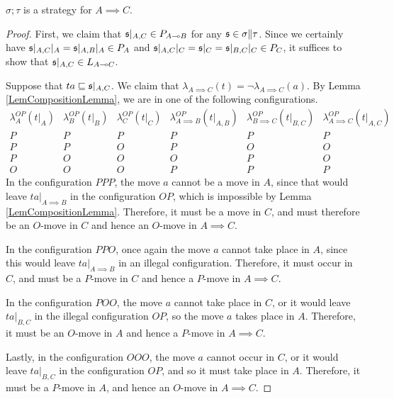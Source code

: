 \documentclass[11pt]{report}
\begin{document}
\begin{proposition}
  $\sigma;\tau$ is a strategy for $A\implies C$.  
\end{proposition}
\begin{proof}
  First, we claim that $\mathfrak s\vert_{A,C}\in P_{A\multimap B}$ for any $\mathfrak s\in \sigma\|\tau$.
  Since we certainly have $\mathfrak s\vert_{A,C}\vert_A = \mathfrak s\vert_{A,B}\vert_A\in P_A$ and $\mathfrak s\vert_{A,C}\vert_C = \mathfrak s\vert_C = \mathfrak s\vert_{B,C}\vert_C\in P_C$, it suffices to show that $\mathfrak s\vert_{A,C}\in L_{A\multimap C}$.

  Suppose that $ta\sqsubseteq \mathfrak s\vert_{A,C}$.  We claim that $\lambda_{A\implies C}(t) = \neg\lambda_{A\implies C}(a)$.
  By Lemma \ref{LemCompositionLemma}, we are in one of the following configurations.
  \small
  \[
    \begin{array}{ccc|ccc}
      \lambda_A^{OP}(t\vert_A) & \lambda_B^{OP}(t\vert_B) & \lambda_C^{OP}(t\vert_C) & \lambda_{A\implies B}^{OP}(t\vert_{A,B}) & \lambda_{B\implies C}^{OP}(t\vert_{B,C}) & \lambda_{A\implies C}^{OP}(t\vert_{A,C}) \\
      \hline
      P & P & P & P & P & P \\
      P & P & O & P & O & O \\
      P & O & O & O & P & O \\
      O & O & O & P & P & P 
    \end{array}
    \]
  \normalsize
  In the configuration $PPP$, the move $a$ cannot be a move in $A$, since that would leave $ta\vert_{A\implies B}$ in the configuration $OP$, which is impossible by Lemma \ref{LemCompositionLemma}.  
  Therefore, it must be a move in $C$, and must therefore be an $O$-move in $C$ and hence an $O$-move in $A\implies C$.

  In the configuration $PPO$, once again the move $a$ cannot take place in $A$, since this would leave $ta\vert_{A\implies B}$ in an illegal configuration.  
  Therefore, it must occur in $C$, and must be a $P$-move in $C$ and hence a $P$-move in $A\implies C$.

  In the configuration $POO$, the move $a$ cannot take place in $C$, or it would leave $ta\vert_{B,C}$ in the illegal configuration $OP$, so the move $a$ takes place in $A$.  
  Therefore, it must be an $O$-move in $A$ and hence a $P$-move in $A\implies C$.  

  Lastly, in the configuration $OOO$, the move $a$ cannot occur in $C$, or it would leave $ta\vert_{B,C}$ in the configuration $OP$, and so it must take place in $A$.  
  Therefore, it must be a $P$-move in $A$, and hence an $O$-move in $A\implies C$.


\end{proof}
\end{document}
